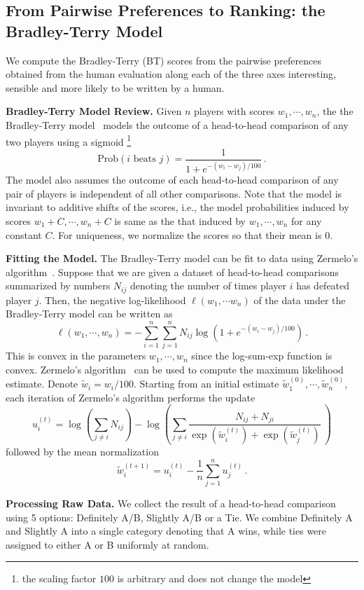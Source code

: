 \documentclass{article}
\newcommand{\myparagraph}[1]{\par\noindent\textbf{{#1}.}} %
\newcommand \e {e}
\theoremstyle{definition}
\begin{document}
\subsection{From Pairwise Preferences to Ranking: the Bradley-Terry Model}
\label{sec:a:human-eval:bt}
We compute the Bradley-Terry (BT) scores from the pairwise preferences 
obtained from the human evaluation along each of the three axes
interesting, sensible and more likely to be written by a human.

\myparagraph{Bradley-Terry Model Review}
Given $n$ players with scores $w_1, \cdots, w_n$, the 
the Bradley-Terry model~\cite{bt:book:1995} 
models the outcome of a head-to-head comparison
of any two players using a sigmoid%
\footnote{the scaling factor $100$ is arbitrary and does not change the model}
%
\[
    \text{Prob}(i \text{ beats } j) = \frac{1}{1 + \e^{-(w_i - w_j) / 100}} \,.
\]
The model also assumes the outcome of each head-to-head comparison of any pair of players is independent of all
other comparisons.
Note that the model is invariant to 
additive shifts of the scores, i.e., 
the model probabilities induced by scores 
$w_1 + C, \cdots, w_n + C$ is same as the that 
induced by $w_1, \cdots, w_n$ for any constant $C$.
For uniqueness, we normalize the scores so that their mean is $0$.

\myparagraph{Fitting the Model}
The Bradley-Terry model can be fit to data 
using Zermelo's algorithm~\cite{hunter2004mm}.
Suppose that we are given a dataset
of head-to-head comparisons summarized by 
numbers $N_{ij}$ denoting the number of times player $i$
has defeated player $j$. 
Then, the negative log-likelihood $\ell(w_1, \cdots w_n)$ 
of the data under the 
Bradley-Terry model can be written as
\[
    \ell(w_1, \cdots, w_n) = 
        -\sum_{i=1}^n\sum_{j=1}^n N_{ij} \log(1 + \e^{-(w_i - w_j) / 100}) \,.
\]
This is convex in the parameters $w_1, \cdots, w_n$ since 
the log-sum-exp function is convex. 
Zermelo's algorithm~\cite{hunter2004mm} can be used to compute the maximum likelihood estimate. 
Denote $\widetilde w_i = w_i / 100$. 
Starting from an initial estimate $\widetilde w_1^{(0)}, \cdots, \widetilde w_n^{(0)}$,
each iteration of Zermelo's algorithm performs the update
\[
     u_i^{(t)} = \log\left( \sum_{j\neq i} N_{ij} \right)
     - \log\left( \sum_{j\neq i} \frac{N_{ij} + N_{ji}}{
     \exp(\widetilde w_i^{(t)}) + \exp(\widetilde w_j^{(t)})} \  \right)
\]
followed by the mean normalization 
\[
    \widetilde w_i^{(t+1)} = u_i^{(t)} - \frac{1}{n} \sum_{j=1}^n u_j^{(t)} \,.
\]
\myparagraph{Processing Raw Data}
We collect the result of a head-to-head comparison using 5 options: Definitely A/B, Slightly A/B or a Tie. We combine Definitely A and Slightly A into a single category denoting that A wins, while ties were assigned to either A or B uniformly at random.
\end{document}
